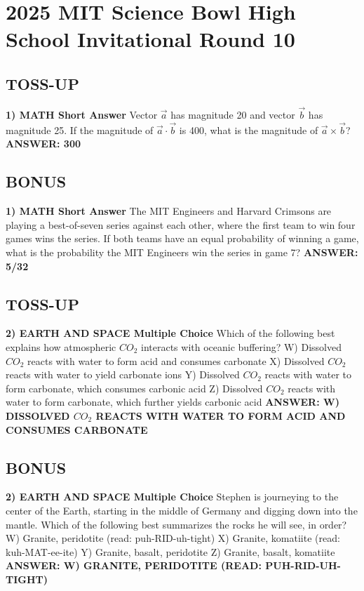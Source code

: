 \documentclass{article}
\begin{document}
\section*{2025 MIT Science Bowl High School Invitational Round 10}

\subsection*{TOSS-UP}
\textbf{1) MATH Short Answer} Vector $\vec{a}$ has magnitude 20 and vector $\vec{b}$ has magnitude 25. If the magnitude of $\vec{a} \cdot \vec{b}$ is 400, what is the magnitude of $\vec{a}\times\vec{b}$?
\newline
\textbf{ANSWER: 300}

\subsection*{BONUS}
\textbf{1) MATH Short Answer} The MIT Engineers and Harvard Crimsons are playing a best-of-seven series against each other, where the first team to win four games wins the series. If both teams have an equal probability of winning a game, what is the probability the MIT Engineers win the series in game 7?
\newline
\textbf{ANSWER: 5/32}

\subsection*{TOSS-UP}
\textbf{2) EARTH AND SPACE Multiple Choice} Which of the following best explains how atmospheric $CO_{2}$ interacts with oceanic buffering?
\newline
W) Dissolved $CO_{2}$ reacts with water to form acid and consumes carbonate
\newline
X) Dissolved $CO_{2}$ reacts with water to yield carbonate ions
\newline
Y) Dissolved $CO_{2}$ reacts with water to form carbonate, which consumes carbonic acid
\newline
Z) Dissolved $CO_{2}$ reacts with water to form carbonate, which further yields carbonic acid
\newline
\textbf{ANSWER: W) DISSOLVED $CO_{2}$ REACTS WITH WATER TO FORM ACID AND CONSUMES CARBONATE}

\subsection*{BONUS}
\textbf{2) EARTH AND SPACE Multiple Choice} Stephen is journeying to the center of the Earth, starting in the middle of Germany and digging down into the mantle. Which of the following best summarizes the rocks he will see, in order?
\newline
W) Granite, peridotite (read: puh-RID-uh-tight)
\newline
X) Granite, komatiite (read: kuh-MAT-ee-ite)
\newline
Y) Granite, basalt, peridotite
\newline
Z) Granite, basalt, komatiite
\newline
\textbf{ANSWER: W) GRANITE, PERIDOTITE (READ: PUH-RID-UH-TIGHT)}
\end{document}
